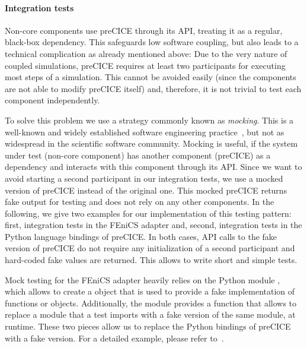 \paragraph{Integration tests} Non-core components use preCICE through its API, treating it as a regular, black-box dependency. This safeguards low software coupling, but also leads to a technical complication as already mentioned above: Due to the very nature of coupled simulations, preCICE requires at least two participants for executing most steps of a simulation. This cannot be avoided easily (since the components are not able to modify preCICE itself) and, therefore, it is not trivial to test each component independently.

To solve this problem we use a strategy commonly known as \emph{mocking}. This is a well-known and widely established software engineering practice~\cite{fowler2007mocks}, but not as widespread in the scientific software community. Mocking is useful, if the system under test (non-core component) has another component (preCICE) as a dependency and interacts with this component through its API. Since we want to avoid starting a second participant in our integration tests, we use a mocked version of preCICE instead of the original one. This mocked preCICE returns fake output for testing and does not rely on any other components.
In the following, we give two examples for our implementation of this testing pattern: first, integration tests in the FEniCS adapter and, second, integration tests in the Python language bindings of preCICE. In both cases, API calls to the fake version of preCICE do not require any initialization of a second participant and hard-coded fake values are returned. This allows to write short and simple tests.

Mock testing for the FEniCS adapter heavily relies on the Python module , which allows to create a  object that is used to provide a fake implementation of functions or objects. Additionally, the module provides a  function that allows to replace a module that a test imports with a fake version of the same module, at runtime. These two pieces allow us to replace the Python bindings of preCICE with a fake version. For a detailed example, please refer to~\cite{rodenberg2021fenicsprecice}.

